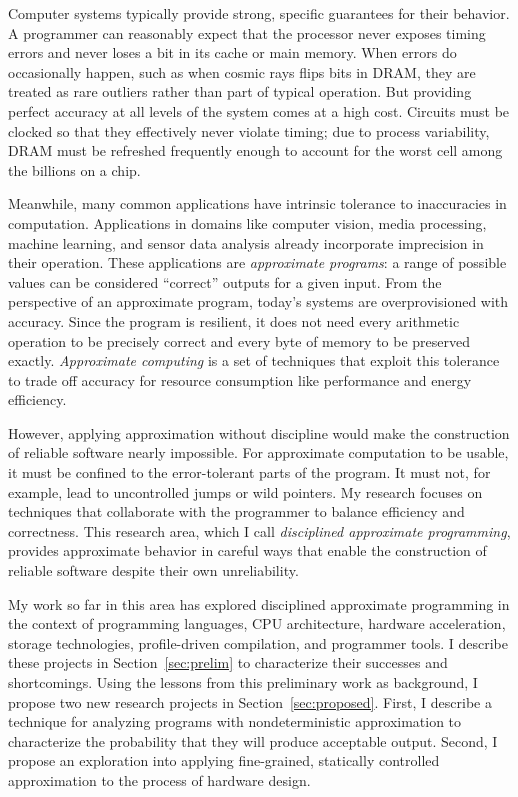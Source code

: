 Computer systems typically provide strong, specific guarantees for their behavior. A
programmer can reasonably expect that the processor never exposes timing
errors and never loses a bit in its cache or main memory. When errors do
occasionally happen, such as when cosmic rays flips bits in DRAM, they are
treated as rare outliers rather than part of typical operation.
But providing perfect accuracy at all levels of the system comes at a high
cost. Circuits must be clocked so that they effectively never violate timing;
due to process variability, DRAM must be refreshed frequently enough to
account for the worst cell among the billions on a chip.

Meanwhile, many common applications have intrinsic tolerance to inaccuracies
in computation. Applications in domains like computer vision, media
processing, machine learning, and sensor data analysis already incorporate
imprecision in their operation. These applications are \emph{approximate
programs}: a range of possible values can be considered ``correct'' outputs
for a given input. From the perspective of an approximate program, today's
systems are overprovisioned with accuracy. Since the program is resilient, it
does
not need every arithmetic operation to be precisely correct and every byte of memory to be preserved
exactly. \emph{Approximate computing} is a set of techniques that exploit this
tolerance to trade off accuracy for resource consumption like performance and
energy efficiency.

However, applying approximation without discipline would make the construction
of reliable software nearly impossible. For approximate computation to be
usable, it must be confined to the error-tolerant parts of the program.  It
must not, for example, lead to uncontrolled jumps or wild pointers. My
research focuses on techniques that collaborate with the programmer to balance
efficiency and correctness. This research area, which I call \emph{disciplined
approximate programming}, provides approximate behavior in careful ways that
enable the construction of reliable software despite their own unreliability.

My work so far in this area has explored disciplined approximate programming
in the context of programming languages, CPU architecture, hardware
acceleration, storage technologies, profile-driven compilation, and programmer
tools. I describe these projects in Section~\ref{sec:prelim} to characterize
their successes and shortcomings. Using the lessons from this preliminary work
as background, I propose two new research projects in
Section~\ref{sec:proposed}. First, I describe a technique for analyzing
programs with nondeterministic approximation to characterize the probability
that they will produce acceptable output. Second, I propose an exploration
into applying fine-grained, statically controlled approximation to the process
of hardware design.


